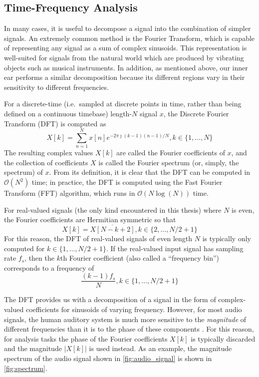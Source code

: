 \subsection{Time-Frequency Analysis}

In many cases, it is useful to decompose a signal into the combination of simpler signals.
An extremely common method is the Fourier Transform, which is capable of representing any signal as a sum of complex sinusoids.
This representation is well-suited for signals from the natural world which are produced by vibrating objects such as musical instruments.
In addition, as mentioned above, our inner ear performs a similar decomposition because its different regions vary in their sensitivity to different frequencies.

For a discrete-time (i.e.\ sampled at discrete points in time, rather than being defined on a continuous timebase) length-$N$ signal $x$, the Discrete Fourier Transform (DFT) is computed as
\begin{equation}
        X[k] = \sum_{n = 1}^N x[n] e^{-2\pi \jmath (k - 1)(n - 1)/N}, k \in \{1, \ldots, N\}
\end{equation}
The resulting complex values $X[k]$ are called the Fourier coefficients of $x$, and the collection of coefficients $X$ is called the Fourier spectrum (or, simply, the spectrum) of $x$.
From its definition, it is clear that the DFT can be computed in $\mathcal{O}(N^2)$ time; in practice, the DFT is computed using the Fast Fourier Transform (FFT) algorithm, which runs in $\mathcal{O}(N \log(N))$ time.

For real-valued signals (the only kind encountered in this thesis) where $N$ is even, the Fourier coefficients are Hermitian symmetric so that
\begin{equation}
        X[k] = \overline{X[N - k + 2]}, k \in \{2, \ldots, N/2 + 1\}
\end{equation}
For this reason, the DFT of real-valued signals of even length $N$ is typically only computed for $k \in \{1, \ldots, N/2 + 1\}$.
If the real-valued input signal has sampling rate $f_s$, then the $k$th Fourier coefficient (also called a ``frequency bin'') corresponds to a frequency of
\begin{equation}
        \frac{(k - 1)f_s}{N}, k \in \{1, \ldots, N/2 + 1\}
        \label{eq:bin_freq}
\end{equation}

The DFT provides us with a decomposition of a signal in the form of complex-valued coefficients for sinusoids of varying frequency.
However, for most audio signals, the human auditory system is much more sensitive to the {\em magnitude} of different frequencies than it is to the phase of these components \cite{}.
For this reason, for analysis tasks the phase of the Fourier coefficients $X[k]$ is typically discarded and the magnitude $|X[k]|$ is used instead.
As an example, the magnitude spectrum of the audio signal shown in \cref{fig:audio_signal} is shown in \cref{fig:spectrum}.

